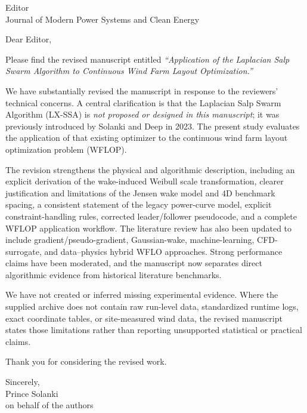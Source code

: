 \documentclass[11pt]{letter}
\begin{document}
\begin{letter}{Editor\\Journal of Modern Power Systems and Clean Energy}
\opening{Dear Editor,}

Please find the revised manuscript entitled \textit{``Application of the Laplacian Salp Swarm Algorithm to Continuous Wind Farm Layout Optimization.''}

We have substantially revised the manuscript in response to the reviewers' technical concerns. A central clarification is that the Laplacian Salp Swarm Algorithm (LX-SSA) is \emph{not proposed or designed in this manuscript}; it was previously introduced by Solanki and Deep in 2023. The present study evaluates the application of that existing optimizer to the continuous wind farm layout optimization problem (WFLOP).

The revision strengthens the physical and algorithmic description, including an explicit derivation of the wake-induced Weibull scale transformation, clearer justification and limitations of the Jensen wake model and 4D benchmark spacing, a consistent statement of the legacy power-curve model, explicit constraint-handling rules, corrected leader/follower pseudocode, and a complete WFLOP application workflow. The literature review has also been updated to include gradient/pseudo-gradient, Gaussian-wake, machine-learning, CFD-surrogate, and data--physics hybrid WFLO approaches. Strong performance claims have been moderated, and the manuscript now separates direct algorithmic evidence from historical literature benchmarks.

We have not created or inferred missing experimental evidence. Where the supplied archive does not contain raw run-level data, standardized runtime logs, exact coordinate tables, or site-measured wind data, the revised manuscript states those limitations rather than reporting unsupported statistical or practical claims.

Thank you for considering the revised work.

\closing{Sincerely,\\Prince Solanki\\on behalf of the authors}
\end{letter}
\end{document}
